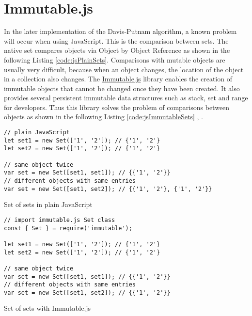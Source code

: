 \section{Immutable.js}
\label{sec:tecImmutable}
In the later implementation of the Davis-Putnam algorithm, a known problem will occur when using JavaScript. This is the comparison between sets. The native set compares objects via Object by Object Reference as shown in the following Listing \ref{code:jsPlainSets}. Comparisons with mutable objects are usually very difficult, because when an object changes, the location of the object in a collection also changes. The \href{https://immutable-js.github.io/immutable-js/}{Immutable.js} library enables the creation of immutable objects that cannot be changed once they have been created. It also provides several persistent immutable data structures such as stack, set and range for developers. Thus this library solves the problem of comparisons between objects as shown in the following Listing \ref{code:jsImmutableSets} \cite{Immutable.jsAuthors2019}, \cite{Rauschmayer2015}.

\begin{listing}[h!]
\begin{verbatim}
// plain JavaScript
let set1 = new Set(['1', '2']); // {'1', '2'}
let set2 = new Set(['1', '2']); // {'1', '2'}

// same object twice
var set = new Set([set1, set1]); // {{'1', '2'}}
// different objects with same entries
var set = new Set([set1, set2]); // {{'1', '2'}, {'1', '2'}}
\end{verbatim}
    \caption{Set of sets in plain JavaScript}
    \label{code:jsPlainSets}
\end{listing}

\begin{listing}[h!]
\begin{verbatim}
// import immutable.js Set class
const { Set } = require('immutable');

let set1 = new Set(['1', '2']); // {'1', '2'}
let set2 = new Set(['1', '2']); // {'1', '2'}

// same object twice
var set = new Set([set1, set1]); // {{'1', '2'}}
// different objects with same entries
var set = new Set([set1, set2]); // {{'1', '2'}}
\end{verbatim}
    \caption{Set of sets with Immutable.js}
    \label{code:jsImmutableSets}
\end{listing}

